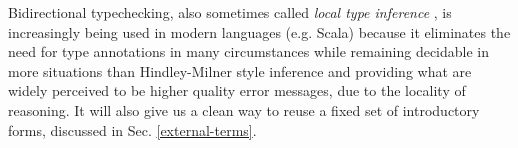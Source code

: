 \documentclass{llncs}
\begin{document}
Bidirectional typechecking, also sometimes called \emph{local type inference} \cite{Pierce:2000:LTI:345099.345100}, is increasingly being used in modern languages (e.g. Scala) because it eliminates the need for type annotations in many circumstances while remaining decidable in more situations than Hindley-Milner style inference and providing what are widely perceived to be higher quality error messages, due to the locality of reasoning. It will also give us a clean way to reuse a fixed set of  introductory forms, discussed in Sec. \ref{external-terms}.

\end{document}
